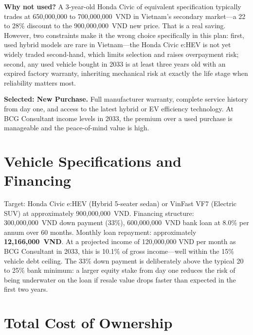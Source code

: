 \textbf{Why not used?} A 3-year-old Honda Civic of equivalent specification typically trades at 650,000,000 to 700,000,000~VND in Vietnam's secondary market---a 22 to 28\% discount to the 900,000,000~VND new price. That is a real saving. However, two constraints make it the wrong choice specifically in this plan: first, used hybrid models are rare in Vietnam---the Honda Civic e:HEV is not yet widely traded second-hand, which limits selection and raises overpayment risk; second, any used vehicle bought in 2033 is at least three years old with an expired factory warranty, inheriting mechanical risk at exactly the life stage when reliability matters most.

\textbf{Selected: New Purchase.} Full manufacturer warranty, complete service history from day one, and access to the latest hybrid or EV efficiency technology. At BCG Consultant income levels in 2033, the premium over a used purchase is manageable and the peace-of-mind value is high.

\section{Vehicle Specifications and Financing}

Target: Honda Civic e:HEV (Hybrid 5-seater sedan) or VinFast VF7 (Electric SUV) at approximately 900,000,000~VND. Financing structure: 300,000,000~VND down payment (33\%), 600,000,000~VND bank loan at 8.0\% per annum over 60 months. Monthly loan repayment: approximately \textbf{12,166,000~VND}. At a projected income of 120,000,000 VND per month as BCG Consultant in 2033, this is 10.1\% of gross income---well within the 15\% vehicle debt ceiling. The 33\% down payment is deliberately above the typical 20 to 25\% bank minimum: a larger equity stake from day one reduces the risk of being underwater on the loan if resale value drops faster than expected in the first two years.

\section{Total Cost of Ownership}

